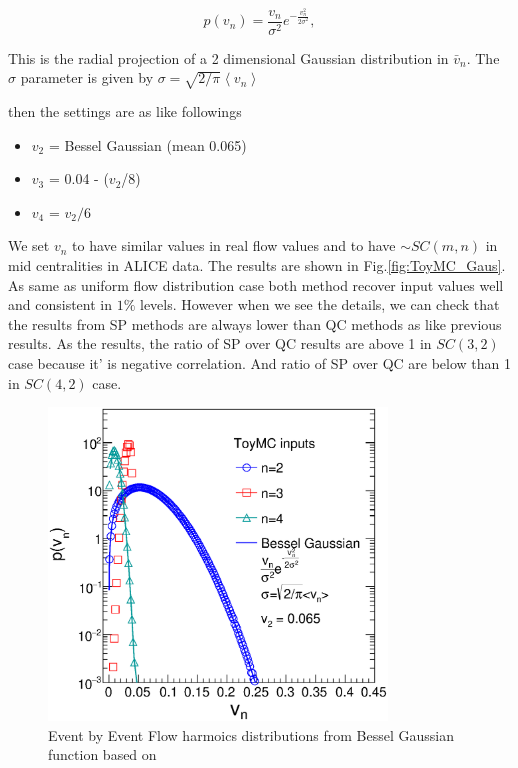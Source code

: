 \begin{equation}
p\left(v_n\right) = \frac{v_n}{\sigma^2}e^{-{\frac{v_n^2}{2\sigma^2}}},
\label{eq:gaussproj1}
\end{equation}

This is the radial projection of a 2 dimensional Gaussian distribution in $\bar v_n$. The $\sigma$ parameter is given by $\sigma=\sqrt{2/\pi}\left<v_n\right>$

then the settings are as like followings
\begin{itemize}
	\item $v_2$ = Bessel Gaussian (mean 0.065)
	\item $v_3$ = 0.04 - ($v_2$/8)
	\item $v_4$ = $v_2 / 6$ 
\end{itemize}

We set $v_n$ to have similar values in real flow values and to have $\sim SC(m,n)$ in mid centralities in ALICE data. The results are shown in Fig.\ref{fig:ToyMC_Gaus}. As same as uniform flow distribution case both method recover input values well and consistent in $1\%$ levels. However when we see the details, we can check that the results from SP methods are always lower than QC methods as like previous results. As the results, the ratio of SP over QC results are above 1 in $SC(3,2)$ case because it' is negative correlation. And ratio of SP over QC are below than 1 in $SC(4,2)$ case. 

\begin{figure}[h]
\centerline{\includegraphics[width=9.0cm]{figures/figs_ToyMC/toymc_vn_input.eps}}
\caption{Event by Event Flow harmoics distributions from Bessel Gaussian function based on \cite{ATLAS:2012jna}}
\label{vn5}
\end{figure}



